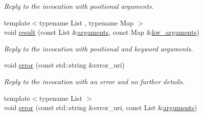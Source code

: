 \begin{DoxyCompactItemize}
\begin{DoxyCompactList}\small\item\em Reply to the invocation with positional arguments. \end{DoxyCompactList}\item 
{\footnotesize template$<$typename List , typename Map $>$ }\\void \hyperlink{classautobahn_1_1wamp__invocation__impl_afeb8b79864e9b49b774a0d3b0f402315}{result} (const List \&\hyperlink{classautobahn_1_1wamp__invocation__impl_aa310c722287e63499c6d30cc8e308cba}{arguments}, const Map \&\hyperlink{classautobahn_1_1wamp__invocation__impl_a29184a2573d07b389bc25bfa3444c112}{kw\+\_\+arguments})\hypertarget{classautobahn_1_1wamp__invocation__impl_afeb8b79864e9b49b774a0d3b0f402315}{}\label{classautobahn_1_1wamp__invocation__impl_afeb8b79864e9b49b774a0d3b0f402315}

\begin{DoxyCompactList}\small\item\em Reply to the invocation with positional and keyword arguments. \end{DoxyCompactList}\item 
void \hyperlink{classautobahn_1_1wamp__invocation__impl_a103e787dd80273ef91f8525c5113a004}{error} (const std\+::string \&error\+\_\+uri)\hypertarget{classautobahn_1_1wamp__invocation__impl_a103e787dd80273ef91f8525c5113a004}{}\label{classautobahn_1_1wamp__invocation__impl_a103e787dd80273ef91f8525c5113a004}

\begin{DoxyCompactList}\small\item\em Reply to the invocation with an error and no further details. \end{DoxyCompactList}\item 
{\footnotesize template$<$typename List $>$ }\\void \hyperlink{classautobahn_1_1wamp__invocation__impl_a88d51ea626ed0b8e7c5f4d882654d4b2}{error} (const std\+::string \&error\+\_\+uri, const List \&\hyperlink{classautobahn_1_1wamp__invocation__impl_aa310c722287e63499c6d30cc8e308cba}{arguments})\hypertarget{classautobahn_1_1wamp__invocation__impl_a88d51ea626ed0b8e7c5f4d882654d4b2}{}\label{classautobahn_1_1wamp__invocation__impl_a88d51ea626ed0b8e7c5f4d882654d4b2}


\end{DoxyCompactItemize}
